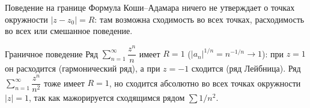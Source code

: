 \begin{Remark}{Поведение на границе}{}
	Формула Коши--Адамара ничего не утверждает о точках окружности $|z - z_0| = R$: там возможна сходимость во всех точках, расходимость во всех или смешанное поведение.
\end{Remark}

\begin{Example}{Граничное поведение}{}
	Ряд $\sum_{n=1}^{\infty} \dfrac{z^n}{n}$ имеет $R = 1$ ($|a_n|^{1/n} = n^{-1/n} \to 1$): при $z = 1$ он расходится (гармонический ряд), а при $z = -1$ сходится (ряд Лейбница). Ряд $\sum_{n=1}^{\infty} \dfrac{z^n}{n^2}$ тоже имеет $R = 1$, но сходится абсолютно во всех точках окружности $|z| = 1$, так как мажорируется сходящимся рядом $\sum 1/n^2$.
\end{Example}
